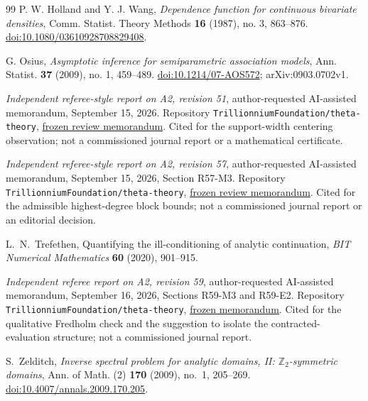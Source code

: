 \begin{thebibliography}{99}
P. W. Holland and Y. J. Wang, \emph{Dependence function for continuous
bivariate densities}, Comm. Statist. Theory Methods \textbf{16} (1987),
no. 3, 863--876. \href{https://doi.org/10.1080/03610928708829408}{doi:10.1080/03610928708829408}.

G. Osius, \emph{Asymptotic inference for semiparametric association models},
Ann. Statist. \textbf{37} (2009), no. 1, 459--489.
\href{https://doi.org/10.1214/07-AOS572}{doi:10.1214/07-AOS572}; arXiv:0903.0702v1.


\emph{Independent referee-style report on A2, revision 51},
author-requested AI-assisted memorandum, September 15, 2026.
Repository \texttt{TrillionniumFoundation/theta-theory},
\href{https://github.com/TrillionniumFoundation/theta-theory/blob/d0fd9a9b0d5cdd8004f42a7f109e39de50adda75/reviews/a2-v51-independent-harsh-top4-2026-09-15/REFEREE_REPORT.md}{frozen review memorandum}.
Cited for the support-width centering observation; not a commissioned
journal report or a mathematical certificate.


\emph{Independent referee-style report on A2, revision 57},
author-requested AI-assisted memorandum, September 15, 2026,
Section R57-M3. Repository
\texttt{Trillionnium\allowbreak Foundation/\allowbreak theta-theory},
\href{https://github.com/TrillionniumFoundation/theta-theory/commit/e14138660e716daf60471f3b98e8f1d30cb61a34}{frozen review memorandum}.
Cited for the admissible highest-degree block bounds; not a commissioned
journal report or an editorial decision.

L.~N.~Trefethen, Quantifying the ill-conditioning of analytic continuation,
\emph{BIT Numerical Mathematics} \textbf{60} (2020), 901--915.


\emph{Independent referee report on A2, revision 59},
author-requested AI-assisted memorandum, September 16, 2026,
Sections R59-M3 and R59-E2. Repository
\texttt{Trillionnium\allowbreak Foundation/\allowbreak theta-theory},
\href{https://github.com/TrillionniumFoundation/theta-theory/blob/f480cf1d099128c0c84df1ed149cff9b75e6ba2d/reviews/a2-v59-independent-harsh-top4-2026-09-16/REFEREE_REPORT.md}{frozen memorandum}.
Cited for the qualitative Fredholm check and the suggestion to isolate
the contracted-evaluation structure; not a commissioned journal report.

S.~Zelditch, \emph{Inverse spectral problem for analytic domains, II:
$\mathbb Z_2$-symmetric domains}, Ann. of Math. (2) \textbf{170} (2009),
no.~1, 205--269.
\href{https://doi.org/10.4007/annals.2009.170.205}{doi:10.4007/annals.2009.170.205}.


\end{thebibliography}
